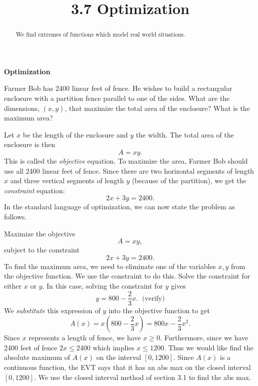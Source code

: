 \documentclass{ximera}
\title{3.7 Optimization}
\begin{document}
\begin{abstract}
We find extremes of functions which model real world situations.
\end{abstract}

\maketitle

\begin{center}
\textbf{Optimization}
\end{center}
 

\begin{example}[example 1]
Farmer Bob has 2400 linear feet of fence. He wishes to build a rectangular enclosure with a partition fence parallel to one of the sides.  
What are the dimensions, $(x,y)$, that maximize the total area of the enclosure? What is the maximum area?


\begin{image}
\end{image}
Let $x$ be the length of the enclosure and $y$ the width.  The total area of the enclosure is then
\[A= xy.\]
This is called the {\it objective} equation.
To maximize the area, Farmer Bob should use all 2400 linear feet of fence.  Since there are two horizontal segments of length $x$ and three vertical segments of length $y$ (because of the partition), we get the {\it constraint} equation:
\[2x+3y=2400.\]
In the standard language of optimization, we can now state the problem as follows.

Maximize the objective
\[A = xy,\]
subject to the constraint 
\[2x+3y = 2400.\]
To find the maximum area, we need to eliminate one of the variables $x, y$ from the objective function.
We use the constraint to do this.  Solve the constraint for either $x$ or $y$.
In this case, solving the constraint for $y$ gives
\[y = 800 - \frac23 x. \;\; \text{(verify)}\]
We {\it substitute} this expression of $y$ into the objective function to get 
\[A(x) = x\left(800 - \frac23 x\right) = 800x - \frac23 x^2.\]
Since $x$ represents a length of fence, we have $x \geq 0$. Furthermore, since we have 2400 feet of fence $2x \leq 2400$ which implies $x\leq 1200$.
Thus we would like find the absolute maximum of $A(x)$ on the interval $[0, 1200]$. Since $A(x)$ is a continuous function, the EVT says that it has an abs max on the closed interval $[0, 1200]$.  We use the closed interval method of section 3.1 to find the abs max.


\end{example}
\end{document}
